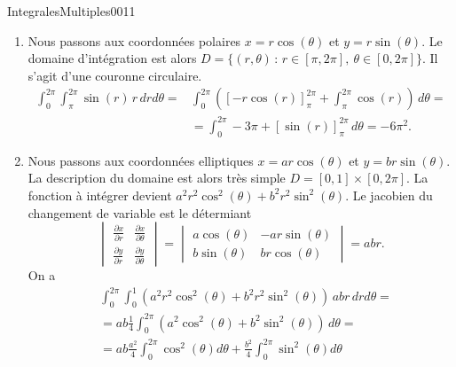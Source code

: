 \begin{corrige}{IntegralesMultiples0011}

  \begin{enumerate}
  \item Nous passons aux coordonnées polaires $x=r\cos(\theta)$ et $y=r\sin(\theta)$. Le domaine d'intégration est alors $D=\{(r,\theta) \,:\, r\in[\pi,2\pi],\: \theta \in[0, 2\pi]\}$. Il s'agit d'une couronne circulaire. 
    \begin{equation}
      \begin{aligned}
        \int_{0}^{2\pi}\int_{\pi}^{2\pi} \sin(r) \,r \, dr d\theta=&\int_{0}^{2\pi}\left(\left[-r\cos(r)\right]_{\pi}^{2\pi}+\int_{\pi}^{2\pi}\cos(r)\right)\,d\theta=\\
        &= \int_{0}^{2\pi}-3\pi+ \left[\sin(r)\right]_{\pi}^{2\pi}\,d\theta=-6\pi^2.
      \end{aligned}
    \end{equation}
  \item Nous passons aux coordonnées elliptiques $x=ar\cos(\theta)$ et $y=br\sin(\theta)$. La description du domaine est alors très simple $D=[0,1]\times[0,2\pi]$. La fonction à intégrer devient $a^2r^2\cos^2(\theta)+b^2r^2\sin^2(\theta)$. Le jacobien du changement de variable est le détermiant
      \begin{equation}
          \begin{vmatrix}
              \frac{ \partial x }{ \partial r }  &   \frac{ \partial x }{ \partial \theta }    \\ 
              \frac{ \partial y }{ \partial r }  &   \frac{ \partial y }{ \partial \theta }    
          \end{vmatrix}=\begin{vmatrix}
              a\cos(\theta)  &   -ar\sin(\theta)    \\ 
              b\sin(\theta)  &   br\cos(\theta)    
          \end{vmatrix}=abr.
      \end{equation}
      On a 
    \begin{equation}
      \begin{aligned}
        &\int_{0}^{2\pi}\int_{0}^{1} \left(a^2r^2\cos^2(\theta)+b^2r^2\sin^2(\theta)\right) \,abr \, dr d\theta=\\
        &=ab\frac{1}{4}\int_{0}^{2\pi}\left(a^2\cos^2(\theta)+b^2\sin^2(\theta)\right)\,d\theta=\\
        &=ab\frac{a^2}{4}\int_{0}^{2\pi}\cos^2(\theta)d\theta+ \frac{b^2}{4} \int_{0}^{2\pi}\sin^2(\theta)d\theta\\

\end{aligned}
\end{equation}
\end{enumerate}
\end{corrige}
